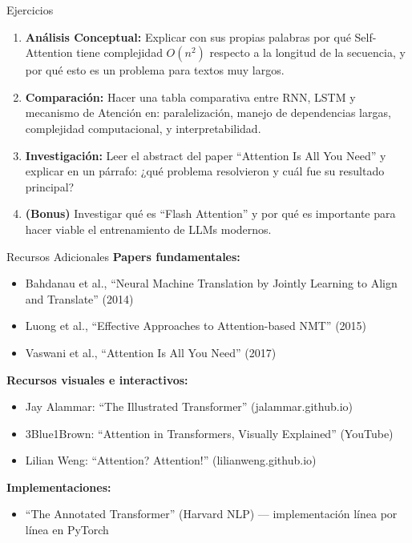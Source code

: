 \documentclass[aspectratio=169]{beamer}
\begin{document}
\begin{frame}{Ejercicios}
    \begin{enumerate}

        
        \item \textbf{Análisis Conceptual:} Explicar con sus propias palabras por qué Self-Attention tiene complejidad $O(n^2)$ respecto a la longitud de la secuencia, y por qué esto es un problema para textos muy largos.
        
        \item \textbf{Comparación:} Hacer una tabla comparativa entre RNN, LSTM y mecanismo de Atención en: paralelización, manejo de dependencias largas, complejidad computacional, y interpretabilidad.
        
        \item \textbf{Investigación:} Leer el abstract del paper ``Attention Is All You Need'' y explicar en un párrafo: ¿qué problema resolvieron y cuál fue su resultado principal?
        
        \item \textbf{(Bonus)} Investigar qué es ``Flash Attention'' y por qué es importante para hacer viable el entrenamiento de LLMs modernos.
    \end{enumerate}
\end{frame}

\begin{frame}{Recursos Adicionales}
    \textbf{Papers fundamentales:}
    \begin{itemize}
        \item Bahdanau et al., ``Neural Machine Translation by Jointly Learning to Align and Translate'' (2014)
        \item Luong et al., ``Effective Approaches to Attention-based NMT'' (2015)
        \item Vaswani et al., ``Attention Is All You Need'' (2017)
    \end{itemize}
    
    \vspace{0.3cm}
    \textbf{Recursos visuales e interactivos:}
    \begin{itemize}
        \item Jay Alammar: ``The Illustrated Transformer'' (jalammar.github.io)
        \item 3Blue1Brown: ``Attention in Transformers, Visually Explained'' (YouTube)
        \item Lilian Weng: ``Attention? Attention!'' (lilianweng.github.io)
    \end{itemize}
    
    \vspace{0.3cm}
    \textbf{Implementaciones:}
    \begin{itemize}
        \item ``The Annotated Transformer'' (Harvard NLP) --- implementación línea por línea en PyTorch
    \end{itemize}
\end{frame}
\end{document}
